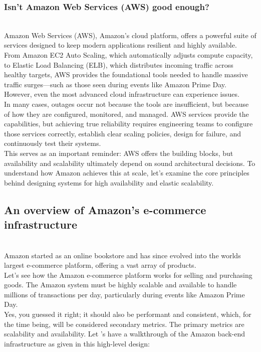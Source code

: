 \subsubsection{Isn't Amazon Web Services (AWS) good enough?}\label{3eGpJMemu1IXpnV-RpQB3}
\\
Amazon Web Services (AWS), Amazon's cloud platform, offers a powerful suite of services designed to keep modern applications resilient and highly available.
\\
From Amazon EC2 Auto Scaling, which automatically adjusts compute capacity, to Elastic Load Balancing (ELB), which distributes incoming traffic across healthy targets, AWS provides the foundational tools needed to handle massive traffic surges---such as those seen during events like Amazon Prime Day.
\\
However, even the most advanced cloud infrastructure can experience issues.
\\
In many cases, outages occur not because the tools are insufficient, but because of how they are configured, monitored, and managed. AWS services provide the capabilities, but achieving true reliability requires engineering teams to configure those services correctly, establish clear scaling policies, design for failure, and continuously test their systems.
\\
This serves as an important reminder: AWS offers the building blocks, but availability and scalability ultimately depend on sound architectural decisions. To understand how Amazon achieves this at scale, let's examine the core principles behind designing systems for high availability and elastic scalability.

\subsection{An overview of Amazon's e-commerce infrastructure}\label{zJ4qIbdXcpdLXynmqHyT7}
\\
Amazon started as an online bookstore and has since evolved into the world\textquotesingle s largest e-commerce platform, offering a vast array of products.
\\
Let's see how the Amazon e-commerce platform works for selling and purchasing goods. The Amazon system must be highly scalable and available to handle millions of transactions per day, particularly during events like Amazon Prime Day.
\\
Yes, you guessed it right; it should also be performant and consistent, which, for the time being, will be considered secondary metrics. The primary metrics are scalability and availability. Let 's have a walkthrough of the Amazon back-end infrastructure as given in this high-level design:

